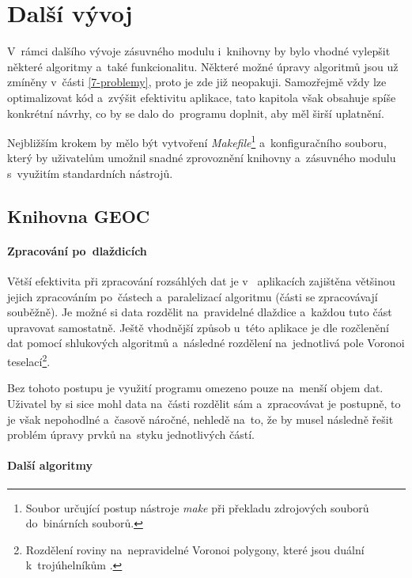 \chapter{Další vývoj}
\label{8-vyvoj}

V~rámci dalšího vývoje zásuvného modulu i~knihovny 
by bylo vhodné vylepšit některé algoritmy a~také funkcionalitu.
Některé možné úpravy algoritmů jsou už zmíněny v~části 
\ref{7-problemy}, proto je zde již neopakuji. 
Samozřejmě vždy lze optimalizovat kód a~zvýšit efekti\-vitu aplikace,
tato kapitola však obsahuje spíše konkrétní návrhy, co by se dalo 
do~programu doplnit, aby měl širší uplatnění.

Nejbližším krokem by mělo být vytvoření \textit{Makefile}\footnote{Soubor 
určující postup nástroje \textit{make} při překladu zdrojových
souborů do~binárních souborů.} a~konfiguračního souboru, který by 
uživatelům umožnil snadné zprovoznění knihovny a~zásuvného modulu
s~využitím standardních nástrojů.

\section{Knihovna GEOC}
\label{geoc-vyvoj}

\subsubsection{Zpracování po~dlaždicích}
\label{dlazdice-vyvoj}

Větší efektivita při zpracování rozsáhlých dat je v~ 
aplikacích zajištěna většinou jejich zpracováním po~částech 
a~paralelizací algoritmu (části se zpracovávají souběžně). Je možné
si data rozdělit na~pravidelné dlaždice a~každou tuto část upravovat
samostatně. Ještě vhodnější způsob u~této aplikace je dle \cite{freitas}
rozčlenění dat pomocí shlukových algoritmů a~následné rozdělení
na~jednotlivá pole Voronoi teselací\footnote{Rozdělení roviny 
na~nepravidelné Voronoi polygony, které jsou duální k~trojúhelníkům
.}.

Bez tohoto postupu je využití programu omezeno pouze na~menší objem
dat. Uživatel by si sice mohl data na~části rozdělit sám a~zpracovávat
je postupně, to je však nepohodlné a~časově náročné, nehledě na~to,
že by musel následně řešit problém úpravy prvků na~styku jednotlivých 
částí.


\subsubsection{Další algoritmy}
\label{dalsi-vyvoj}


